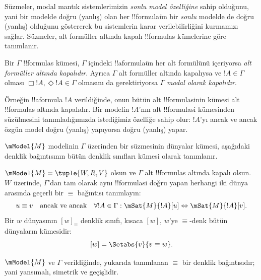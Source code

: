 



Süzmeler, modal mantık sistemlerimizin \emph{sonlu model özelliğine} sahip
olduğunu, yani bir modelde doğru (yanlış) olan her !!{formula}{}ün bir
\emph{sonlu} modelde de doğru (yanlış) olduğunu göstererek bu sistemlerin
karar verilebilirliğini kurmamızı sağlar. Süzmeler, alt formüller altında
kapalı !!{formula}s kümelerine göre tanımlanır.

\begin{defn}
  Bir $\Gamma$ !!{formula}s kümesi, $\Gamma$ içindeki !!a{formula}{}ün her
  alt formülünü içeriyorsa \emph{alt formüller altında kapalıdır}. Ayrıca
  $\Gamma$ alt formüller altında kapalıysa ve $!A\in\Gamma$ olması
  $\Box!A,\Diamond!A\in\Gamma$ olmasını da gerektiriyorsa $\Gamma$
  \emph{modal olarak kapalıdır}.
\end{defn}

Örneğin !!a{formula} $!A$ verildiğinde, onun bütün alt !!{formula}s{}inin
kümesi alt !!{formula}s altında kapalıdır. Bir modelin $!A$'nın alt
!!{formula}s{}i kümesinden süzülmesini tanımladığımızda istediğimiz özelliğe
sahip olur: $!A$'yı ancak ve ancak özgün model doğru (yanlış) yapıyorsa doğru
(yanlış) yapar.

$\mModel{M}$ modelinin $\Gamma$ üzerinden bir süzmesinin dünyalar kümesi,
aşağıdaki denklik bağıntısının bütün denklik sınıfları kümesi olarak
tanımlanır.

\begin{defn}
$\mModel{M}=\tuple{W,R,V}$ olsun ve $\Gamma$ alt !!{formula}s altında
kapalı olsun. $W$ üzerinde, $\Gamma$'dan tam olarak aynı !!{formula}s{}i doğru
yapan herhangi iki dünya arasında geçerli bir $\equiv$ bağıntısı tanımlayın:
\[
u \equiv v \quad \text{ancak ve ancak} \quad
\forall !A \in \Gamma : \mSat{M}{!A}[u] \Leftrightarrow \mSat{M}{!A}[v].
\]
Bir $w$ dünyasının $[w]_\equiv$ denklik sınıfı, kısaca $[w]$, $w$'ye
$\equiv$-denk bütün dünyaların kümesidir:
\[
[w] = \Setabs{v}{v \equiv w}.
\]
\end{defn}

\begin{prop}
  $\mModel{M}$ ve $\Gamma$ verildiğinde, yukarıda tanımlanan $\equiv$ bir
  denklik bağıntısıdır; yani yansımalı, simetrik ve geçişlidir.
\end{prop}

